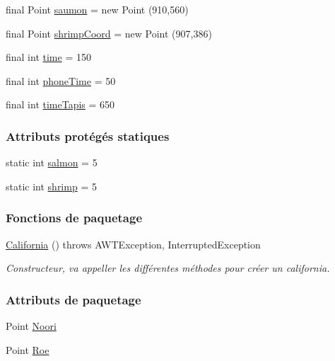 \begin{DoxyCompactItemize}
\item 
final Point \hyperlink{classTestSushi_1_1src_1_1Suchi_1_1Recette_a855a7ed217eec3565619156fa6cd4214}{saumon} = new Point (910,560)
\item 
final Point \hyperlink{classTestSushi_1_1src_1_1Suchi_1_1Recette_a69faeadec2c0d475bbd77c3b7eeaada7}{shrimp\+Coord} = new Point (907,386)
\item 
final int \hyperlink{classTestSushi_1_1src_1_1Suchi_1_1Recette_a2c78759553661a7e4b01d4ac1212ec6c}{time} = 150
\item 
final int \hyperlink{classTestSushi_1_1src_1_1Suchi_1_1Recette_a0d95a4a68ee0d423b6815b296f3304b2}{phone\+Time} = 50
\item 
final int \hyperlink{classTestSushi_1_1src_1_1Suchi_1_1Recette_a7db8ec6383e36487bc7ca0490edd0b4a}{time\+Tapis} = 650
\end{DoxyCompactItemize}
\subsubsection*{Attributs protégés statiques}
\begin{DoxyCompactItemize}
\item 
static int \hyperlink{classTestSushi_1_1src_1_1Suchi_1_1Recette_a726a712fe936ef2a96982e00d21c49c0}{salmon} = 5
\item 
static int \hyperlink{classTestSushi_1_1src_1_1Suchi_1_1Recette_a07fa939a0df1b7ff45a9d4aa77498e8e}{shrimp} = 5
\end{DoxyCompactItemize}
\subsubsection*{Fonctions de paquetage}
\begin{DoxyCompactItemize}
\item 
\hyperlink{classTestSushi_1_1src_1_1Suchi_1_1California_a634f2d6d5654850c742733e9649f2d06}{California} ()  throws A\+W\+T\+Exception, Interrupted\+Exception 
\begin{DoxyCompactList}\small\item\em Constructeur, va appeller les différentes méthodes pour créer un california. \end{DoxyCompactList}\end{DoxyCompactItemize}
\subsubsection*{Attributs de paquetage}
\begin{DoxyCompactItemize}
\item 
Point \hyperlink{classTestSushi_1_1src_1_1Suchi_1_1California_a0a9bb5b64454647e04a23e0ef47ad3b6}{Noori}
\item 
Point \hyperlink{classTestSushi_1_1src_1_1Suchi_1_1California_a4bfdebd854fd95d3113f192322a542ff}{Roe}
\end{DoxyCompactItemize}

